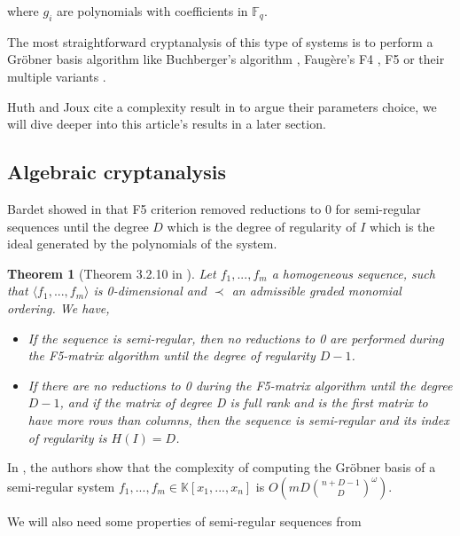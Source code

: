 \documentclass[english]{article}
\newtheorem{theorem}{Theorem}[section]
\begin{document}
		where $g_i$ are polynomials with coefficients in $\mathbb{F}_q$.
		
		The most straightforward cryptanalysis of this type of systems is to perform a Gröbner basis algorithm like Buchberger's algorithm \cite{Buc}, Faugère's F4 \cite{F99}, F5 \cite{F02} or their multiple variants \cite{EF19}.
		
		Huth and Joux cite a complexity result in \cite{FSS11} to argue their parameters choice, we will dive deeper into this article's results in a later section.

		\subsection{Algebraic cryptanalysis}
		
		Bardet showed in \cite{Bardet04} that F5 criterion removed reductions to 0 for semi-regular sequences until the degree $D$ which is the degree of regularity of $I$ which is the ideal generated by the polynomials of the system.
		
		\begin{theorem}[Theorem 3.2.10 in \cite{Bardet04}]
			Let $f_1,...,f_m$ a homogeneous sequence, such that $\langle f_1,...,f_m \rangle$ is 0-dimensional and
			$\prec$ an admissible graded monomial ordering. We have,
			\begin{itemize}
				\item[-] If the sequence is semi-regular, then no reductions to 0 are performed during the F5-matrix algorithm until the degree of regularity $D - 1$.
				\item[-] If there are no reductions to 0 during the F5-matrix algorithm until the degree $D - 1$, and if the matrix of degree D is full rank and is the first matrix to have more rows than columns, then the sequence is semi-regular and its index of regularity is $H(I) = D$.
			\end{itemize}
		\end{theorem}
		
		In \cite{BFS15}, the authors show that the complexity of computing the Gröbner basis of a semi-regular system $f_1,...,f_m \in \mathbb{K}[x_1,...,x_n]$ is $O\left(mD\binom{n+D-1}{D}^\omega \right)$.
		
		We will also need some properties of semi-regular sequences from \cite{Bardet04}
		
\end{document}
